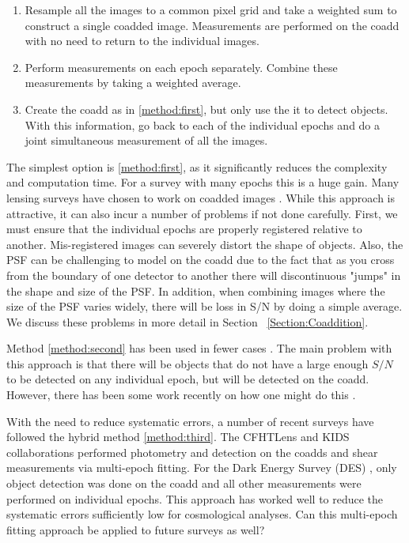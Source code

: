 \documentclass[fleqn,useAMS,usenatbib]{mnras}
\begin{document}
\begin{enumerate}
\item \label{method:first} Resample all the images to a common pixel grid and take a weighted sum to construct a single coadded image.  Measurements are performed on the coadd with no need to return to the individual images.
\item \label{method:second} Perform measurements on each epoch separately.  Combine these measurements by taking a weighted average.  
\item \label{method:third} Create the coadd as in \ref{method:first}, but only use the it to detect objects.  With this information, go back to each of the individual epochs and do a joint simultaneous measurement of all the images.
\end{enumerate}

The simplest option is \ref{method:first}, as it significantly reduces the complexity and computation time.  For a survey with many epochs this is a huge gain.  Many lensing surveys have chosen to work on coadded images \citep{Hoekstra2006, Leauthaud2007, Hettersheidt2007, Lin2012,Melchior2015, Jee2016, Mandelbaum2018}.  While this approach is attractive, it can also incur a number of problems if not done carefully.  First, we must ensure that the individual epochs are properly registered relative to another.  Mis-registered images can severely distort the shape of objects. Also, the PSF can be challenging to model on the coadd due to the fact that as you cross from the boundary of one detector to another there will discontinuous "jumps" in the shape and size of the PSF.  In addition, when combining images where the size of the PSF varies widely, there will be loss in S/N by doing a simple average.  We discuss these problems in more detail in Section ~\ref{Section:Coaddition}.

Method \ref{method:second} has been used in fewer cases \citep{Jarvis2003}.  The main problem with this approach is that there will be objects that do not have a large enough $S/N$ to be detected on any individual epoch, but will be detected on the coadd.  However, there has been some work recently on how one might do this \citep{Budavari2017}.

With the need to reduce systematic errors, a number of recent surveys have followed the hybrid method \ref{method:third}.  The CFHTLens \citep{Heymans2013} and KIDS \citep{Hildebrandt2017} collaborations performed photometry and detection on the coadds and shear measurements via multi-epoch fitting. For the Dark Energy Survey (DES) \citep{Zuntz2017}, only object detection was done on the coadd and all other measurements were performed on individual epochs.  This approach has worked well to reduce the systematic errors sufficiently low for cosmological analyses.  Can this multi-epoch fitting approach be applied to future surveys as well?
\end{document}
